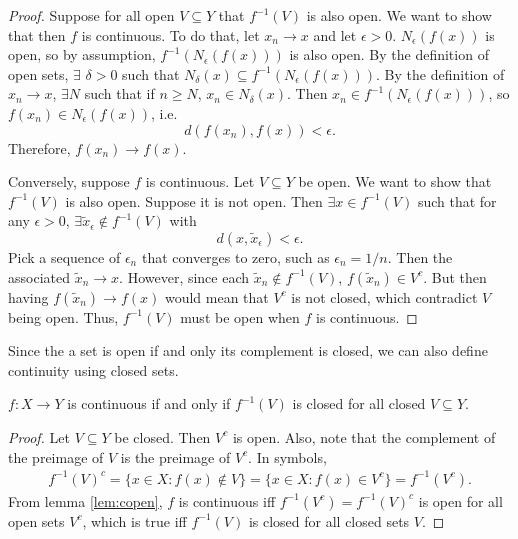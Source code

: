 \begin{proof}
  Suppose for all open $V \subseteq Y$ that $f^{-1}(V)$ is also
  open. We want to show that then $f$ is continuous. To do that, let
  $x_n \to x$ and let $\epsilon>0$. $N_\epsilon(f(x))$ is open, so by
  assumption, $f^{-1}(N_{\epsilon}(f(x)))$ is also open. By the
  definition of open sets, $\exists$ $\delta > 0$ such that
  $N_{\delta}(x) \subseteq f^{-1}(N_{\epsilon}(f(x)))$. By the
  definition of $x_n \to x$, $\exists N$ such that if $n \geq N$, $x_n
  \in N_{\delta}(x)$. Then $x_n \in f^{-1}(N_{\epsilon}(f(x)))$, so
  $f(x_n) \in N_{\epsilon}(f(x))$, i.e.
  \[ d\left(f(x_n),f(x) \right) < \epsilon. \]
  Therefore, $f(x_n) \to f(x)$. 

  Conversely, suppose $f$ is continuous. Let $V \subseteq Y$ be
  open. We want to show that $f^{-1}(V)$ is also open. Suppose it is
  not open. Then $\exists x \in f^{-1}(V)$ such that for any $\epsilon
  > 0$, $\exists \tilde{x}_{\epsilon} \not\in f^{-1}(V)$ with 
  \[ d(x,\tilde{x}_{\epsilon}) < \epsilon. \]
  Pick a sequence of $\epsilon_n$ that converges to zero, such as
  $\epsilon_n = 1/n$. Then the associated $\tilde{x}_n \to
  x$. However, since each $\tilde{x}_n \not\in f^{-1}(V)$,
  $f(\tilde{x}_n) \in V^c$. But then having $f(\tilde{x}_n) \to f(x)$
  would mean that $V^c$ is not closed, which contradict $V$ being
  open. Thus, $f^{-1}(V)$ must be open when $f$ is continuous.
\end{proof}
Since the a set is open if and only its complement is closed, we can
also define continuity using closed sets.
\begin{corollary}
  $f:X \to Y$ is continuous if and only if $f^{-1}(V)$ is closed for all
  closed $V \subseteq Y$. 
\end{corollary}
\begin{proof}
  Let $V \subseteq Y$ be closed. Then $V^c$ is open. Also, note that
  the complement of the preimage of $V$ is the preimage of $V^c$. In
  symbols,
  \begin{align*}
    f^{-1}(V)^c = \{x \in X: f(x) \not\in V \} = \{x \in X: f(x) \in V^c
    \} = f^{-1}(V^c).
  \end{align*}
  From lemma \ref{lem:copen}, $f$ is continuous iff $f^{-1}(V^c) =
  f^{-1}(V)^c$ is open for all open sets $V^c$, which is true iff
  $f^{-1}(V)$ is closed for all closed sets $V$.
\end{proof}

